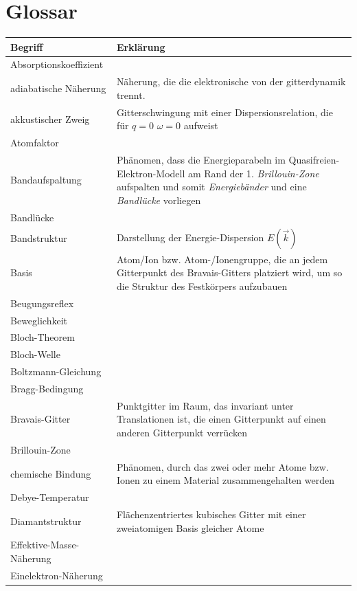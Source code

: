 \documentclass{article}
\begin{document}
\section{Glossar}
\begin{xltabular}{\linewidth}{p{6cm}|X}
	\hline\hline
		Begriff & Erklärung \\
	\hline
		Absorptionskoeffizient &  \\
	\hline
		adiabatische Näherung & Näherung, die die elektronische von der gitterdynamik trennt. \\
	\hline
		akkustischer Zweig & Gitterschwingung mit einer Dispersionsrelation, die für $q=0$ $\omega=0$ aufweist \\
	\hline
		Atomfaktor &  \\
	\hline
		Bandaufspaltung & Phänomen, dass die Energieparabeln im Quasifreien-Elektron-Modell am Rand der 1. \textit{Brillouin-Zone} aufspalten und somit \textit{Energiebänder} und eine \textit{Bandlücke} vorliegen \\
	\hline
		Bandlücke &  \\
	\hline
		Bandstruktur & Darstellung der Energie-Dispersion $E(\vec{k})$ \\
	\hline
		Basis & Atom/Ion bzw. Atom-/Ionengruppe, die an jedem Gitterpunkt des Bravais-Gitters platziert wird, um so die Struktur des Festkörpers aufzubauen \\
	\hline
		Beugungsreflex &  \\
	\hline
		Beweglichkeit &  \\
	\hline
		Bloch-Theorem &  \\
	\hline
		Bloch-Welle &  \\
	\hline
		Boltzmann-Gleichung &  \\
	\hline
		Bragg-Bedingung &  \\
	\hline
		Bravais-Gitter & Punktgitter im Raum, das invariant unter Translationen ist, die einen Gitterpunkt auf einen anderen Gitterpunkt verrücken \\
	\hline
		Brillouin-Zone &  \\
	\hline
		chemische Bindung & Phänomen, durch das zwei oder mehr Atome bzw. Ionen zu einem Material zusammengehalten werden \\
	\hline
		Debye-Temperatur &  \\
	\hline
		Diamantstruktur & Flächenzentriertes kubisches Gitter mit einer zweiatomigen Basis gleicher Atome \\
	\hline
		Effektive-Masse-Näherung &  \\
	\hline
		Einelektron-Näherung &  \\

\end{xltabular}
\end{document}
